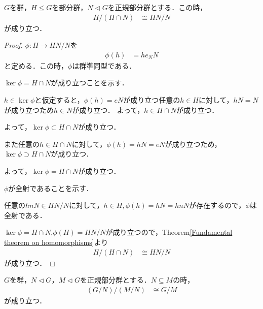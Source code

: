 \begin{theorem}

$G$を群，$H \leq   G$を部分群，$N\lhd G$を正規部分群とする．この時，
\begin{align}
    H/(H\cap N) &\cong HN/N
\end{align}
が成り立つ．
\end{theorem}
\begin{proof}
    $\phi : H\to HN/N$を
    \begin{align}
        \phi(h) &= he_N N
    \end{align}
    と定める．この時，$\phi$は群準同型である．

    $\ker\phi=H\cap N$が成り立つことを示す．

    $h \in \ker\phi$と仮定すると，$\phi(h)=eN$が成り立つ任意の$h\in H$に対して，$hN=N$が成り立つため$h\in N$が成り立つ．
    よって，$h\in H\cap N$が成り立つ．

    よって，$\ker\phi\subset H\cap N$が成り立つ．

    また任意の$h\in H\cap N$に対して，$\phi(h)=hN=eN$が成り立つため，$\ker\phi\supset H\cap N$が成り立つ．

    よって，$\ker\phi=H\cap N$が成り立つ．

    $\phi$が全射であることを示す．

    任意の$hnN\in HN/N$に対して，$h\in H,\phi(h)=hN=hnN$が存在するので，$\phi$は全射である．

    $\ker\phi=H\cap N$,$\phi(H)=HN/N$が成り立つので，Theorem\ref{Fundamental theorem on homomorphisms}より
    \begin{align}
        H/(H\cap N) &\cong HN/N
    \end{align}
    が成り立つ．
\end{proof}
\begin{theorem}
$G$を群，$N\lhd G$，$M\lhd G$を正規部分群とする．$N\subseteq M$の時，
\begin{align}
    (G/N)/(M/N) &\cong G/M
\end{align}
が成り立つ．
\end{theorem}
